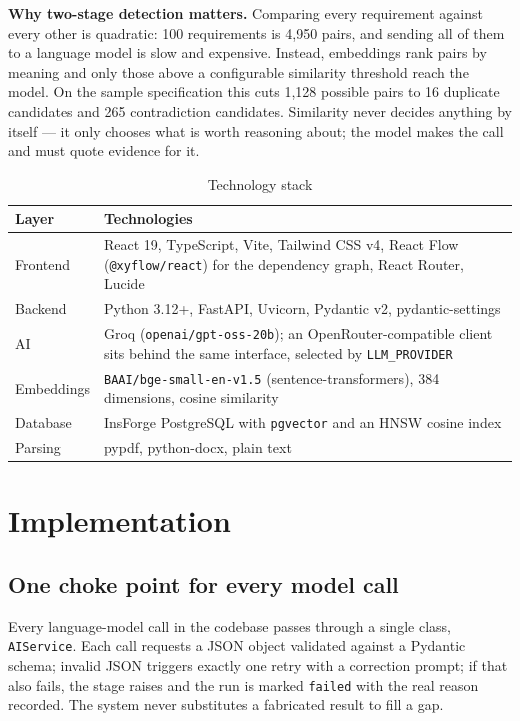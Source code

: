 \textbf{Why two-stage detection matters.} Comparing every requirement against
every other is quadratic: 100 requirements is 4{,}950 pairs, and sending all of
them to a language model is slow and expensive. Instead, embeddings rank pairs
by meaning and only those above a configurable similarity threshold reach the
model. On the sample specification this cuts 1{,}128 possible pairs to 16
duplicate candidates and 265 contradiction candidates. Similarity never decides
anything by itself --- it only chooses what is worth reasoning about; the model
makes the call and must quote evidence for it.

\begin{table}[h!]
\centering\small
\begin{tabular}{@{}p{2.4cm} p{13.0cm}@{}}
\toprule
\textbf{Layer} & \textbf{Technologies} \\
\midrule
Frontend & React 19, TypeScript, Vite, Tailwind CSS v4, React Flow (\texttt{@xyflow/react}) for the dependency graph, React Router, Lucide \\
Backend & Python 3.12+, FastAPI, Uvicorn, Pydantic v2, pydantic-settings \\
AI & Groq (\texttt{openai/gpt-oss-20b}); an OpenRouter-compatible client sits behind the same interface, selected by \texttt{LLM\_PROVIDER} \\
Embeddings & \texttt{BAAI/bge-small-en-v1.5} (sentence-transformers), 384 dimensions, cosine similarity \\
Database & InsForge PostgreSQL with \texttt{pgvector} and an HNSW cosine index \\
Parsing & pypdf, python-docx, plain text \\
\bottomrule
\end{tabular}
\caption{Technology stack}
\end{table}

\section{Implementation}

\subsection{One choke point for every model call}

Every language-model call in the codebase passes through a single class,
\texttt{AIService}. Each call requests a JSON object validated against a
Pydantic schema; invalid JSON triggers exactly one retry with a correction
prompt; if that also fails, the stage raises and the run is marked
\texttt{failed} with the real reason recorded. The system never substitutes a
fabricated result to fill a gap.

